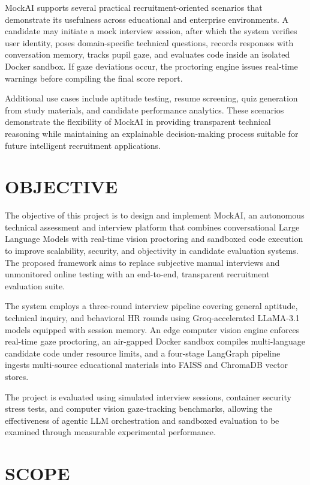 \documentclass[12pt,a4paper]{report}
\begin{document}
MockAI supports several practical recruitment-oriented scenarios that demonstrate its
usefulness across educational and enterprise environments. A candidate may initiate a mock
interview session, after which the system verifies user identity, poses domain-specific
technical questions, records responses with conversation memory, tracks pupil gaze, and
evaluates code inside an isolated Docker sandbox. If gaze deviations occur, the proctoring
engine issues real-time warnings before compiling the final score report.

Additional use cases include aptitude testing, resume screening, quiz generation from study
materials, and candidate performance analytics. These scenarios demonstrate the flexibility
of MockAI in providing transparent technical reasoning while maintaining an explainable
decision-making process suitable for future intelligent recruitment applications.

\section{OBJECTIVE}

The objective of this project is to design and implement MockAI, an autonomous technical
assessment and interview platform that combines conversational Large Language Models
with real-time vision proctoring and sandboxed code execution to improve scalability,
security, and objectivity in candidate evaluation systems. The proposed framework aims
to replace subjective manual interviews and unmonitored online testing with an end-to-end,
transparent recruitment evaluation suite.

The system employs a three-round interview pipeline covering general aptitude, technical
inquiry, and behavioral HR rounds using Groq-accelerated LLaMA-3.1 models equipped
with session memory. An edge computer vision engine enforces real-time gaze proctoring,
an air-gapped Docker sandbox compiles multi-language candidate code under resource
limits, and a four-stage LangGraph pipeline ingests multi-source educational materials into
FAISS and ChromaDB vector stores.

The project is evaluated using simulated interview sessions, container security stress tests,
and computer vision gaze-tracking benchmarks, allowing the effectiveness of agentic LLM
orchestration and sandboxed evaluation to be examined through measurable experimental
performance.

\section{SCOPE}
\end{document}
